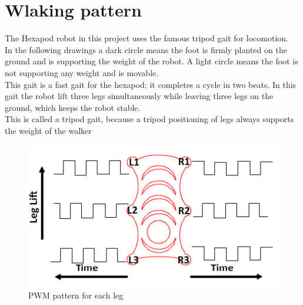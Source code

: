 \documentclass{report}
\begin{document}
\section{Wlaking pattern}
The Hexapod robot in this project uses the famous tripod gait for locomotion.\\
In the following drawings a dark circle means the foot is firmly planted on the ground and is supporting the weight of the robot. A light circle means the foot is not supporting any weight and is movable.\\
This gait is a fast gait for the hexapod; it completes a cycle in two beats. In this gait the robot lift three legs simultaneously while leaving three legs on the ground, which keeps the robot stable.\\
This is called a tripod gait, because a tripod positioning of legs always supports the weight of the walker\\
\begin{figure}[h!]
\centering
\includegraphics[scale=1]{tripodgait}
\caption{PWM pattern for each leg}
\label{fig34}
\end{figure}
\end{document}
